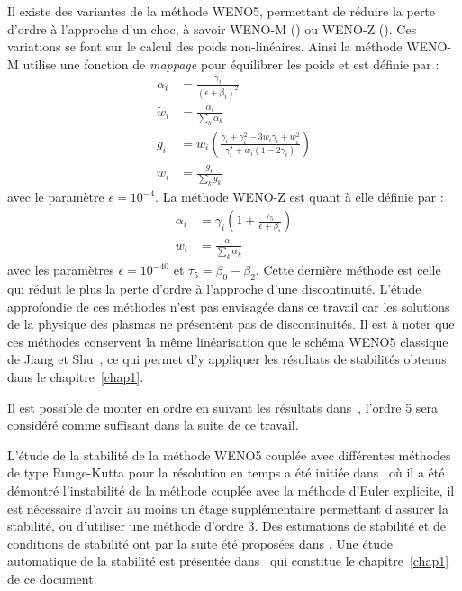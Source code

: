 Il existe des variantes de la méthode WENO5, permettant de réduire la perte d'ordre à l'approche d'un choc, à savoir WENO-M (\cite{Henrick:2005}) ou WENO-Z (\cite{Borges:2008}). Ces variations se font sur le calcul des poids non-linéaires. Ainsi la méthode WENO-M utilise une fonction de \emph{mappage} pour équilibrer les poids et est définie par :
$$
  \begin{aligned}
    \alpha_i    &= \frac{\gamma_i}{(\epsilon + \beta_i)^2} \\
    \tilde{w}_i &= \frac{\alpha_i}{\sum_k \alpha_k} \\
    g_i         &= w_i\left( \frac{\gamma_i + \gamma_i^2 - 3w_i\gamma_i + w_i^2}{\gamma_i^2 + w_i(1-2\gamma_i)} \right) \\
    w_i         &= \frac{g_i}{\sum_k g_k}
  \end{aligned}
$$
avec le paramètre $\epsilon = 10^{-4}$. La méthode WENO-Z est quant à elle définie par :
$$
  \begin{aligned}
    \alpha_i &= \gamma_i\left( 1+ \frac{\tau_5}{\epsilon + \beta_i} \right) \\
    w_i      &= \frac{\alpha_i}{\sum_k \alpha_k}
  \end{aligned}
$$
avec les paramètres $\epsilon = 10^{-40}$ et $\tau_5 = \beta_0 - \beta_2$. Cette dernière méthode est celle qui réduit le plus la perte d'ordre à l'approche d'une discontinuité. L'étude approfondie de ces méthodes n'est pas envisagée dans ce travail car les solutions de la physique des plasmas ne présentent pas de discontinuités. Il est à noter que ces méthodes conservent la même linéarisation que le schéma WENO5 classique de Jiang et Shu~\cite{Jiang:1996}, ce qui permet d'y appliquer les résultats de stabilités obtenus dans le chapitre~\ref{chap1}.

Il est possible de monter en ordre en suivant les résultats dans~\cite{Wu:2021}, l'ordre 5 sera considéré comme suffisant dans la suite de ce travail.

L'étude de la stabilité de la méthode WENO5 couplée avec différentes méthodes de type Runge-Kutta pour la résolution en temps a été initiée dans~\cite{Wang:2007} où il a été démontré l'instabilité de la méthode couplée avec la méthode d'Euler explicite, il est nécessaire d'avoir au moins un étage supplémentaire permettant d'assurer la stabilité, ou d'utiliser une méthode d'ordre 3. Des estimations de stabilité et de conditions de stabilité ont par la suite été proposées dans \cite{Motamed:2010,Lunet:2017}. Une étude automatique de la stabilité est présentée dans~\cite{Crouseilles:2019b} qui constitue le chapitre~\ref{chap1} de ce document.

